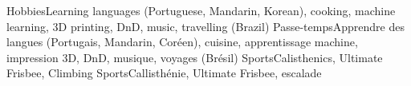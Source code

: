   
    \resumeSubHeadingListStart
        \resumeSubheadingEnFr
            {Hobbies}{}{Learning languages (Portuguese, Mandarin, Korean), cooking, machine learning, 3D printing, DnD, music, travelling (Brazil)}{}
            {Passe-temps}{}{Apprendre des langues (Portugais, Mandarin, Coréen), cuisine, apprentissage machine, impression 3D, DnD, musique, voyages (Brésil)}{}
        \resumeSubheadingEnFr
            {Sports}{}{Calisthenics, Ultimate Frisbee, Climbing}{}
            {Sports}{}{Callisthénie, Ultimate Frisbee, escalade}{}
    \resumeSubHeadingListEnd
